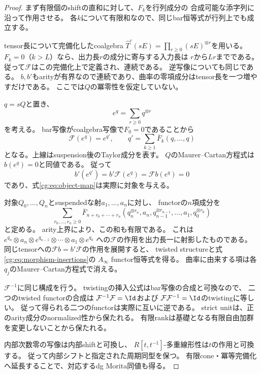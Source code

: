 \begin{proof}
まず有限個のshiftの直和に対して、$F_k$を行列成分の
合成可能な添字列に沿って作用させる。
各$k$について有限和なので、同じbar恒等式が行列上でも成立する。

tensor長について完備化したcoalgebra
$\widehat T^c(sE)=\prod_{r\ge0}(sE)^{\otimes r}$を用いる。
$F_k=0$（$k>L$）なら、出力長$r$の成分に寄与する入力長は
$r$から$Lr$までである。
従って$\mathcal F$はこの完備化上で定義され、連続である。
逆写像についても同じである。
$b,b'$もarityが有界なので連続であり、曲率の零項成分はtensor長を一つ増やすだけである。
ここでは$Q$の冪零性を仮定していない。

$q=sQ$と置き、
\[
 e^q=\sum_{r\ge0}q^{\otimes r}
\]
を考える。
bar写像がcoalgebra写像で$F_0=0$であることから
\[
 \mathcal F(e^q)=e^{q'},\qquad
 q'=\sum_{k\ge1}\overline F_k(q,\ldots,q)
\]
となる。上線はsuspension後のTaylor成分を表す。
$Q$のMaurer--Cartan方程式は$b(e^q)=0$と同値である。
従って
\[
 b'(e^{q'})=b'\mathcal F(e^q)=\mathcal F b(e^q)=0
\]
であり、式\eqref{cg:eq:object-map}は実際に対象を与える。

対象$Q_0,\ldots,Q_n$とsuspendedな射$a_1,\ldots,a_n$に対し、
functorの$n$項成分を
\begin{equation}\label{cg:eq:morphism-insertions}
 \sum_{r_0,\ldots,r_n\ge0}
 \overline F_{n+r_0+\cdots+r_n}
 (q_n^{\otimes r_n},a_n,q_{n-1}^{\otimes r_{n-1}},
 \ldots,a_1,q_0^{\otimes r_0})
\end{equation}
と定める。
arity上界により、この和も有限である。
これは
$e^{q_n}\otimes a_n\otimes e^{q_{n-1}}\otimes\cdots
\otimes a_1\otimes e^{q_0}$
への$\mathcal F$の作用を出力長一に射影したものである。
同じtensorへの$\mathcal F b=b'\mathcal F$の作用を展開すると、
twisted structureと式\eqref{cg:eq:morphism-insertions}の
$A_\infty$ functor恒等式を得る。
曲率に由来する項は各$q_j$のMaurer--Cartan方程式で消える。

$\mathcal F^{-1}$に同じ構成を行う。
twistingの挿入公式はbar写像の合成と可換なので、
二つのtwisted functorの合成は
$\mathcal F^{-1}\mathcal F=\Id$および
$\mathcal F\mathcal F^{-1}=\Id$のtwistingに等しい。
従って得られる二つのfunctorは実際に互いに逆である。
strict unitは、正のarity成分のnormalized性から保たれる。
有限rankは基礎となる有限自由加群を変更しないことから保たれる。

内部次数零の写像は内部shiftと可換し、
$R[t,t^{-1}]$-多重線形性は$t$の作用と可換する。
従って内部シフトと指定された周期同型を保つ。
有限cone・冪等完備化へ延長することで、対応するdg Morita同値も得る。
\end{proof}


